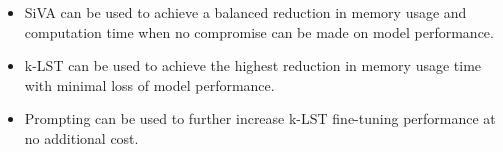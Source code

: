 \begin{itemize}
    \item SiVA can be used to achieve a balanced reduction in memory usage and computation time when no compromise can be made on model performance.
    \item k-LST can be used to achieve the highest reduction in memory usage time with minimal loss of model performance.
    \item Prompting can be used to further increase k-LST fine-tuning performance at no additional cost.
\end{itemize}

\vspace{\baselineskip}
